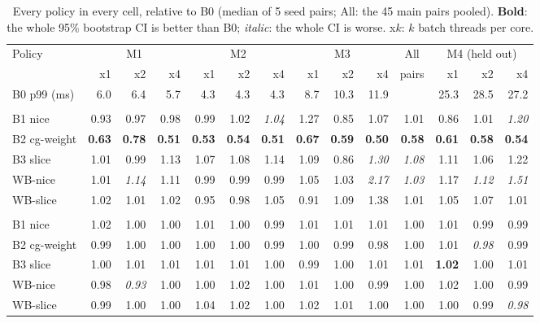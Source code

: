 \begin{table}[t]
\centering
\footnotesize
\caption{Every policy in every cell, relative to B0 (median of 5 seed pairs; All: the 45 main pairs pooled). \textbf{Bold}: the whole 95\% bootstrap CI is better than B0; {\normalfont\itshape italic}: the whole CI is worse. x$k$: $k$ batch threads per core.}
\label{tab:matrix}
\setlength{\tabcolsep}{4.2pt}
\begin{tabular}{@{}lrrrrrrrrrrrrr@{}}
\toprule
Policy & \multicolumn{3}{c}{M1} & \multicolumn{3}{c}{M2} & \multicolumn{3}{c}{M3} & \multicolumn{1}{c}{All} & \multicolumn{3}{c}{M4 (held out)} \\
\cmidrule(lr){2-4}\cmidrule(lr){5-7}\cmidrule(lr){8-10}\cmidrule(lr){12-14}
 & x1 & x2 & x4 & x1 & x2 & x4 & x1 & x2 & x4 & pairs & x1 & x2 & x4 \\
\midrule
B0 p99 (ms) & 6.0 & 6.4 & 5.7 & 4.3 & 4.3 & 4.3 & 8.7 & 10.3 & 11.9 &  & 25.3 & 28.5 & 27.2 \\
\addlinespace[2pt]\multicolumn{14}{@{}l}{\textit{Interactive p99 / B0}} \\
B1 nice & 0.93 & 0.97 & 0.98 & 0.99 & 1.02 & \textit{1.04} & 1.27 & 0.85 & 1.07 & 1.01 & 0.86 & 1.01 & \textit{1.20} \\
B2 cg-weight & \textbf{0.63} & \textbf{0.78} & \textbf{0.51} & \textbf{0.53} & \textbf{0.54} & \textbf{0.51} & \textbf{0.67} & \textbf{0.59} & \textbf{0.50} & \textbf{0.58} & \textbf{0.61} & \textbf{0.58} & \textbf{0.54} \\
B3 slice & 1.01 & 0.99 & 1.13 & 1.07 & 1.08 & 1.14 & 1.09 & 0.86 & \textit{1.30} & \textit{1.08} & 1.11 & 1.06 & 1.22 \\
WB-nice & 1.01 & \textit{1.14} & 1.11 & 0.99 & 0.99 & 0.99 & 1.05 & 1.03 & \textit{2.17} & \textit{1.03} & 1.17 & \textit{1.12} & \textit{1.51} \\
WB-slice & 1.02 & 1.01 & 1.02 & 0.95 & 0.98 & 1.05 & 0.91 & 1.09 & 1.38 & 1.01 & 1.05 & 1.07 & 1.01 \\
\addlinespace[2pt]\multicolumn{14}{@{}l}{\textit{Batch throughput / B0}} \\
B1 nice & 1.02 & 1.00 & 1.00 & 1.01 & 1.00 & 0.99 & 1.01 & 1.01 & 1.01 & 1.00 & 1.01 & 0.99 & 0.99 \\
B2 cg-weight & 0.99 & 1.00 & 1.00 & 1.00 & 1.00 & 0.99 & 1.00 & 0.99 & 0.98 & 1.00 & 1.01 & \textit{0.98} & 0.99 \\
B3 slice & 1.00 & 1.01 & 1.01 & 1.01 & 1.01 & 1.00 & 0.99 & 1.00 & 1.01 & 1.01 & \textbf{1.02} & 1.00 & 1.01 \\
WB-nice & 0.98 & \textit{0.93} & 1.00 & 1.00 & 1.02 & 1.00 & 1.01 & 1.00 & 0.99 & 1.00 & 1.02 & 1.00 & 0.99 \\
WB-slice & 0.99 & 1.00 & 1.00 & 1.04 & 1.02 & 1.00 & 1.02 & 1.01 & 1.00 & 1.00 & 1.00 & 0.99 & \textit{0.98} \\
\bottomrule
\end{tabular}
\end{table}
